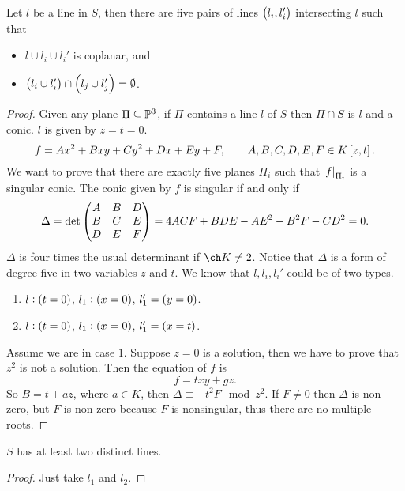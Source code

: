 \pagebreak


\begin{proposition}
Let $ l $ be a line in $ S $, then there are five pairs of lines $ \br{l_i, l_i'} $ intersecting $ l $ such that
\begin{itemize}
\item $ l \cup l_i \cup l_i' $ is coplanar, and
\item $ \br{l_i \cup l_i'} \cap \br{l_j \cup l_j'} = \emptyset $.
\end{itemize}
\end{proposition}

\begin{proof}
Given any plane $ \Pi \subseteq \mathbb{P}^3 $, if $ \Pi $ contains a line $ l $ of $ S $ then $ \Pi \cap S $ is $ l $ and a conic. $ l $ is given by $ z = t = 0 $.
$$ f = Ax^2 + Bxy + Cy^2 + Dx + Ey + F, \qquad A, B, C, D, E, F \in K\sbr{z, t}. $$
We want to prove that there are exactly five planes $ \Pi_i $ such that $ \left. f \right|_{\Pi_i} $ is a singular conic. The conic given by $ f $ is singular if and only if
$$ \Delta = \det \begin{pmatrix} A & B & D \\ B & C & E \\ D & E & F \end{pmatrix} = 4ACF + BDE - AE^2 - B^2F - CD^2 = 0. $$
$ \Delta $ is four times the usual determinant if $ \ch K \ne 2 $. Notice that $ \Delta $ is a form of degree five in two variables $ z $ and $ t $. We know that $ l, l_i, l_i' $ could be of two types.
\begin{enumerate}
\item $ l : \br{t = 0} $, $ l_1 : \br{x = 0} $, $ l_1' = \br{y = 0} $.
\item $ l : \br{t = 0} $, $ l_1 : \br{x = 0} $, $ l_1' = \br{x = t} $.
\end{enumerate}
Assume we are in case $ 1 $. Suppose $ z = 0 $ is a solution, then we have to prove that $ z^2 $ is not a solution. Then the equation of $ f $ is
$$ f = txy + gz. $$
So $ B = t + az $, where $ a \in K $, then $ \Delta \equiv -t^2F \mod z^2 $. If $ F \ne 0 $ then $ \Delta $ is non-zero, but $ F $ is non-zero because $ F $ is nonsingular, thus there are no multiple roots.
\end{proof}

\begin{corollary}
$ S $ has at least two distinct lines.
\end{corollary}

\begin{proof}
Just take $ l_1 $ and $ l_2 $.
\end{proof}

